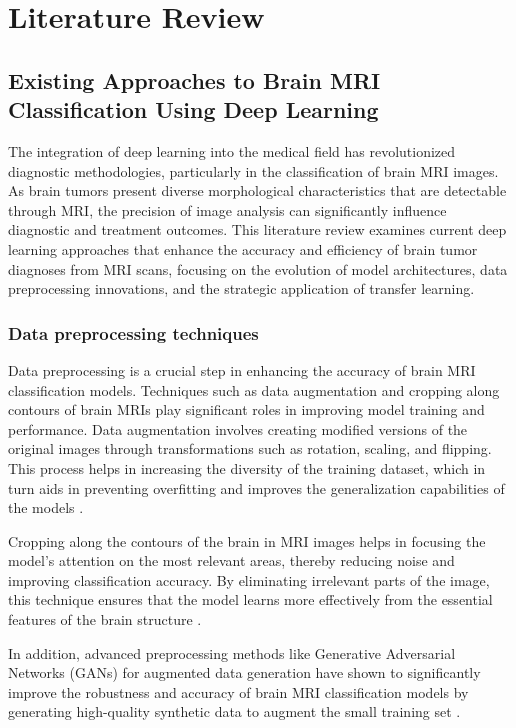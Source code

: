 \section{Literature Review}\label{s:lit_review}

\subsection{Existing Approaches to Brain MRI Classification Using Deep Learning}

The integration of deep learning into the medical field has revolutionized diagnostic methodologies, particularly in the classification of brain MRI images. As brain tumors present diverse morphological characteristics that are detectable through MRI, the precision of image analysis can significantly influence diagnostic and treatment outcomes. This literature review examines current deep learning approaches that enhance the accuracy and efficiency of brain tumor diagnoses from MRI scans, focusing on the evolution of model architectures, data preprocessing innovations, and the strategic application of transfer learning.

\subsubsection{Data preprocessing techniques}

Data preprocessing is a crucial step in enhancing the accuracy of brain MRI classification models. Techniques such as data augmentation \cite{10183465} and cropping along contours of brain MRIs play significant roles in improving model training and performance. Data augmentation involves creating modified versions of the original images through transformations such as rotation, scaling, and flipping. This process helps in increasing the diversity of the training dataset, which in turn aids in preventing overfitting and improves the generalization capabilities of the models \cite{Paul2017Deep}.

Cropping along the contours of the brain in MRI images helps in focusing the model’s attention on the most relevant areas, thereby reducing noise and improving classification accuracy. By eliminating irrelevant parts of the image, this technique ensures that the model learns more effectively from the essential features of the brain structure \cite{Asif2022Improving}.

In addition, advanced preprocessing methods like Generative Adversarial Networks (GANs) for augmented data generation have shown to significantly improve the robustness and accuracy of brain MRI classification models by generating high-quality synthetic data to augment the small training set \cite{Fahimi2020Generative}.


